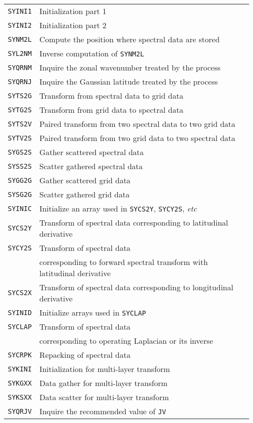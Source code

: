 \documentclass[a4paper]{scrartcl}
\begin{document}
\begin{tabular}{ll}
\texttt{SYINI1} & Initialization part 1\\
\texttt{SYINI2} & Initialization part 2\\
\texttt{SYNM2L} & Compute the position where spectral data are stored\\
\texttt{SYL2NM} & Inverse computation of \texttt{SYNM2L}\\
\texttt{SYQRNM} & Inquire the zonal wavenumber treated by the process\\
\texttt{SYQRNJ} & Inquire the Gaussian latitude treated by the process\\
\texttt{SYTS2G} & Transform from spectral data to grid data\\
\texttt{SYTG2S} & Transform from grid data to spectral data\\
\texttt{SYTS2V} & Paired transform from two spectral data to two grid data\\
\texttt{SYTV2S} & Paired transform from two grid data to two spectral data\\
\texttt{SYGS2S} & Gather scattered spectral data\\
\texttt{SYSS2S} & Scatter gathered spectral data\\
\texttt{SYGG2G} & Gather scattered grid data\\
\texttt{SYSG2G} & Scatter gathered grid data\\
\texttt{SYINIC} & Initialize an array used in \texttt{SYCS2Y}, 
   \texttt{SYCY2S}, \textit{etc}\\
\texttt{SYCS2Y} & Transform of spectral data 
corresponding to latitudinal derivative\\
\texttt{SYCY2S} & Transform of spectral data \\
& corresponding to forward spectral transform with latitudinal derivative\\
\texttt{SYCS2X} & Transform of spectral data 
corresponding to longitudinal derivative\\
\texttt{SYINID} & Initialize arrays used in \texttt{SYCLAP}\\
\texttt{SYCLAP} & Transform of spectral data \\
& corresponding to operating Laplacian or its inverse\\
\texttt{SYCRPK} & Repacking of spectral data\\
\texttt{SYKINI} & Initialization for multi-layer transform\\
\texttt{SYKGXX} & Data gather for multi-layer transform\\
\texttt{SYKSXX} & Data scatter for multi-layer transform\\
\texttt{SYQRJV} & Inquire the recommended value of \texttt{JV}
\end{tabular}
\end{document}
